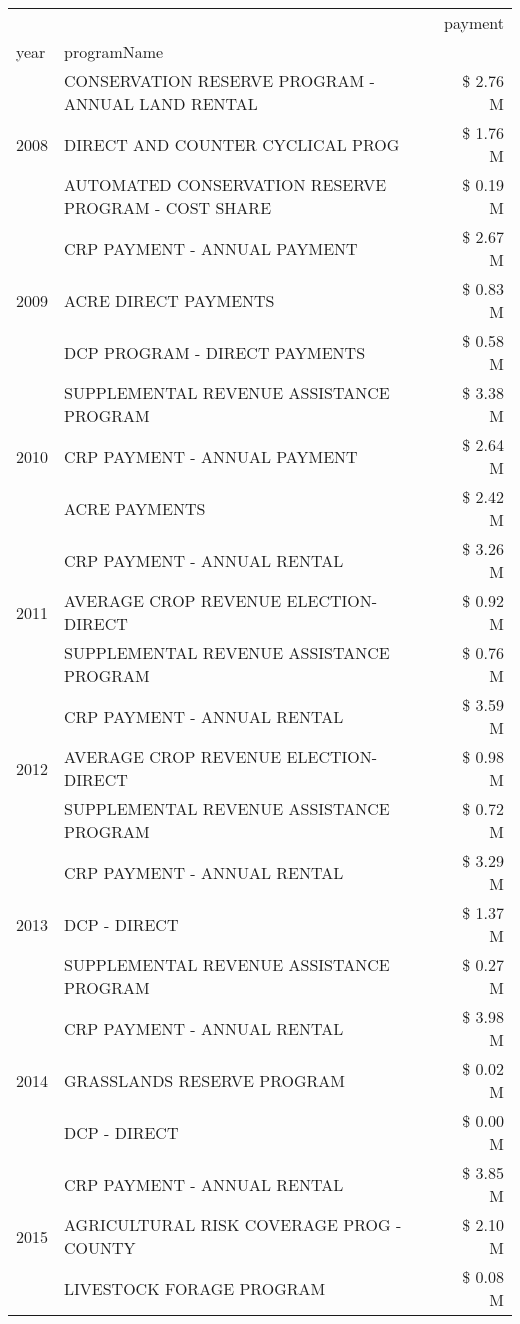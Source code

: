\begin{tabular}{llr}
\toprule
 &  & payment \\
year & programName &  \\
\midrule
\multirow[t]{3}{*}{2008} & CONSERVATION RESERVE PROGRAM - ANNUAL LAND RENTAL & \$ 2.76 M \\
 & DIRECT AND COUNTER CYCLICAL PROG & \$ 1.76 M \\
 & AUTOMATED CONSERVATION RESERVE PROGRAM - COST SHARE & \$ 0.19 M \\
\cline{1-3}
\multirow[t]{3}{*}{2009} & CRP PAYMENT - ANNUAL PAYMENT & \$ 2.67 M \\
 & ACRE DIRECT PAYMENTS & \$ 0.83 M \\
 & DCP PROGRAM - DIRECT PAYMENTS & \$ 0.58 M \\
\cline{1-3}
\multirow[t]{3}{*}{2010} & SUPPLEMENTAL REVENUE ASSISTANCE PROGRAM & \$ 3.38 M \\
 & CRP PAYMENT - ANNUAL PAYMENT & \$ 2.64 M \\
 & ACRE PAYMENTS & \$ 2.42 M \\
\cline{1-3}
\multirow[t]{3}{*}{2011} & CRP PAYMENT - ANNUAL RENTAL & \$ 3.26 M \\
 & AVERAGE CROP REVENUE ELECTION-DIRECT & \$ 0.92 M \\
 & SUPPLEMENTAL REVENUE ASSISTANCE PROGRAM & \$ 0.76 M \\
\cline{1-3}
\multirow[t]{3}{*}{2012} & CRP PAYMENT - ANNUAL RENTAL & \$ 3.59 M \\
 & AVERAGE CROP REVENUE ELECTION-DIRECT & \$ 0.98 M \\
 & SUPPLEMENTAL REVENUE ASSISTANCE PROGRAM & \$ 0.72 M \\
\cline{1-3}
\multirow[t]{3}{*}{2013} & CRP PAYMENT - ANNUAL RENTAL & \$ 3.29 M \\
 & DCP - DIRECT & \$ 1.37 M \\
 & SUPPLEMENTAL REVENUE ASSISTANCE PROGRAM & \$ 0.27 M \\
\cline{1-3}
\multirow[t]{3}{*}{2014} & CRP PAYMENT - ANNUAL RENTAL & \$ 3.98 M \\
 & GRASSLANDS RESERVE PROGRAM & \$ 0.02 M \\
 & DCP - DIRECT & \$ 0.00 M \\
\cline{1-3}
\multirow[t]{3}{*}{2015} & CRP PAYMENT - ANNUAL RENTAL & \$ 3.85 M \\
 & AGRICULTURAL RISK COVERAGE PROG - COUNTY & \$ 2.10 M \\
 & LIVESTOCK FORAGE PROGRAM & \$ 0.08 M \\

\end{tabular}
